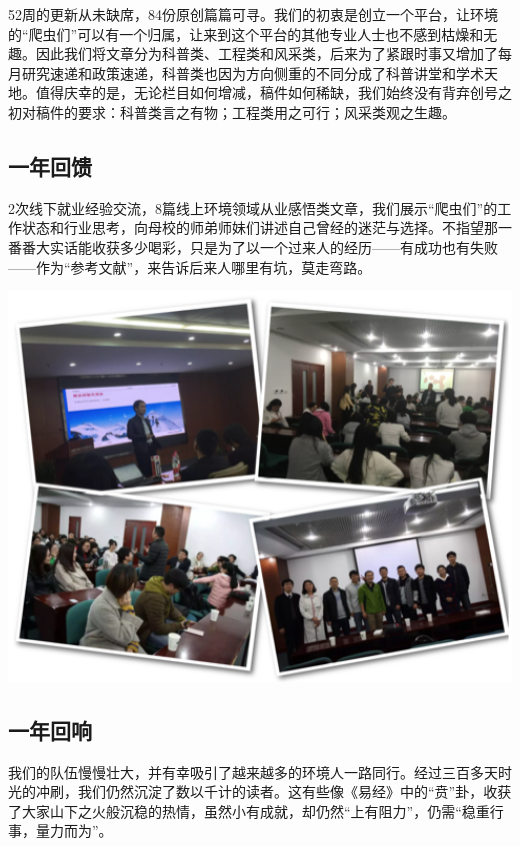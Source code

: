 \documentclass[]{book}
\begin{document}
52周的更新从未缺席，84份原创篇篇可寻。我们的初衷是创立一个平台，让环境的``爬虫们''可以有一个归属，让来到这个平台的其他专业人士也不感到枯燥和无趣。因此我们将文章分为科普类、工程类和风采类，后来为了紧跟时事又增加了每月研究速递和政策速递，科普类也因为方向侧重的不同分成了科普讲堂和学术天地。值得庆幸的是，无论栏目如何增减，稿件如何稀缺，我们始终没有背弃创号之初对稿件的要求：科普类言之有物；工程类用之可行；风采类观之生趣。

\hypertarget{ux4e00ux5e74ux56deux9988}{%
\subsection{一年回馈}\label{ux4e00ux5e74ux56deux9988}}

2次线下就业经验交流，8篇线上环境领域从业感悟类文章，我们展示``爬虫们''的工作状态和行业思考，向母校的师弟师妹们讲述自己曾经的迷茫与选择。不指望那一番番大实话能收获多少喝彩，只是为了以一个过来人的经历------有成功也有失败------作为``参考文献''，来告诉后来人哪里有坑，莫走弯路。

\includegraphics[width=6.67in]{images/oneyear2}

\hypertarget{ux4e00ux5e74ux56deux54cd}{%
\subsection{一年回响}\label{ux4e00ux5e74ux56deux54cd}}

我们的队伍慢慢壮大，并有幸吸引了越来越多的环境人一路同行。经过三百多天时光的冲刷，我们仍然沉淀了数以千计的读者。这有些像《易经》中的``贲''卦，收获了大家山下之火般沉稳的热情，虽然小有成就，却仍然``上有阻力''，仍需``稳重行事，量力而为''。
\end{document}
